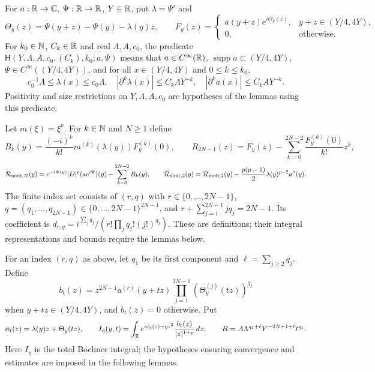 \begin{definition}
  \label{def:c03_multiplier_phase}
  For $a:\mathbb{R}\to\mathbb{C}$, $\Psi:\mathbb{R}\to\mathbb{R}$, $Y\in\mathbb{R}$, put $\lambda=\Psi'$ and
  \[
    \Theta_y(z)=\Psi(y+z)-\Psi(y)-\lambda(y)z,\qquad
    F_y(z)=\begin{cases}a(y+z)e^{i\Theta_y(z)},&y+z\in(Y/4,4Y),\\0,&\text{otherwise}.\end{cases}
  \]
  For $k_0\in\mathbb{N}$, $C_k\in\mathbb{R}$ and real $\Lambda,A,c_0$, the predicate
  $\mathsf H(Y,\Lambda,A,c_0,(C_k),k_0;a,\Psi)$ means that $a\in C^\infty(\mathbb{R})$,
  $\operatorname{supp}a\subset(Y/4,4Y)$, $\Psi\in C^\infty((Y/4,4Y))$, and for all
  $x\in(Y/4,4Y)$ and $0\le k\le k_0$,
  \[
    c_0^{-1}\Lambda\le\lambda(x)\le c_0\Lambda,\quad
    |\partial^k\lambda(x)|\le C_k\Lambda Y^{-k},\quad
    |\partial^ka(x)|\le C_kAY^{-k}.
  \]
  Positivity and size restrictions on $Y,\Lambda,A,c_0$ are hypotheses of the lemmas using this predicate.
\end{definition}

\begin{definition}
  \label{def:c03_multiplier_remainder}
  Let $m(\xi)=\xi^p$. For $k\in\mathbb{N}$ and $N\ge1$ define
  \[
    B_k(y)=\frac{(-i)^k}{k!}m^{(k)}(\lambda(y))F_y^{(k)}(0),\qquad
    R_{2N-1}(z)=F_y(z)-\sum_{k=0}^{2N-2}\frac{F_y^{(k)}(0)}{k!}z^k,
  \]
  \[
    \mathcal{R}_{\mathrm{mult},N}(y)=e^{-i\Psi(y)}|D|^p(ae^{i\Psi})(y)-\sum_{k=0}^{2N-2}B_k(y),\qquad
    \widetilde{\mathcal{R}}_{\mathrm{mult},2}(y)=\mathcal{R}_{\mathrm{mult},2}(y)
      -\frac{p(p-1)}2\lambda(y)^{p-2}a''(y).
  \]
  The finite index set consists of $(r,q)$ with $r\in\{0,\ldots,2N-1\}$,
  $q=(q_1,\ldots,q_{2N-1})\in\{0,\ldots,2N-1\}^{2N-1}$, and
  $r+\sum_{j=1}^{2N-1}j q_j=2N-1$. Its coefficient is
  $d_{r,q}=i^{\sum_jq_j}/(r!\prod_j q_j!(j!)^{q_j})$.
  These are definitions; their integral representations and bounds require the lemmas below.
\end{definition}

\begin{definition}
  \label{def:c03_multiplier_summands}
  For an index $(r,q)$ as above, let $q_1$ be its first component and
  $\ell=\sum_{j\ge2}q_j$. Define
  \[
    b_t(z)=z^{2N-1}a^{(r)}(y+tz)\prod_{j=1}^{2N-1}(\Theta_y^{(j)}(tz))^{q_j}
  \]
  when $y+tz\in(Y/4,4Y)$, and $b_t(z)=0$ otherwise. Put
  \[
    \phi_t(z)=\lambda(y)z+\Theta_y(tz),\qquad
    I_\eta(y,t)=\int_{\mathbb{R}} e^{i\phi_t(z)-\eta z^2}\frac{b_t(z)}{|z|^{1+p}}\,dz,
    \qquad B=A\Lambda^{q_1+\ell}Y^{-2N+1+\ell}t^{q_1}.
  \]
  Here $I_\eta$ is the total Bochner integral; the hypotheses ensuring convergence and estimates
  are imposed in the following lemmas.
\end{definition}

